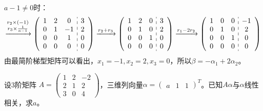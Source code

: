 \documentclass[a4paper]{report}
\begin{document}
\begin{jie}
$a-1\neq 0$时：
\begin{equation*}
\xrightarrow{\substack{r_{2}\times(-1)\\r_{3}\times \frac{1}{a-1}}}
{
\left(
 \begin{array}{c:c}
\begin{matrix}
1 & 2 & 0\\
0 & 1 & -1 \\
0 & 0 & 1\\
0 & 0 & 0
\end{matrix}&
\begin{matrix}
3 \\
2  \\
0\\
0
\end{matrix}
\end{array}
\right)
}\xrightarrow{\substack{r_{2}+r_{3}}}
{
\left(
 \begin{array}{c:c}
\begin{matrix}
1 & 2 & 0\\
0 & 1 & 0 \\
0 & 0 & 1\\
0 & 0 & 0
\end{matrix}&
\begin{matrix}
3 \\
2  \\
0\\
0
\end{matrix}
\end{array}
\right)
}\xrightarrow{\substack{r_{1}-2r_{2}}}
{
\left(
 \begin{array}{c:c}
\begin{matrix}
1 & 0 & 0\\
0 & 1 & 0 \\
0 & 0 & 1\\
0 & 0 & 0
\end{matrix}&
\begin{matrix}
-1 \\
2  \\
0\\
0
\end{matrix}
\end{array}
\right)
}
\end{equation*}
由最简阶梯型矩阵可以看出，$x_1=-1,x_2=2,x_3=0$，所以$\beta=-\alpha_1+2\alpha_2$。
\end{jie}

\EX 设3阶矩阵
$
A=
\begin{pmatrix}
1&2&-2\\ 2&1&2\\ 3&0&4
\end{pmatrix}
$，三维列向量$\alpha=
\begin{pmatrix}
a&1&1
\end{pmatrix}^T
$。已知$A\alpha$与$\alpha$线性相关，求$a$。
\end{document}

